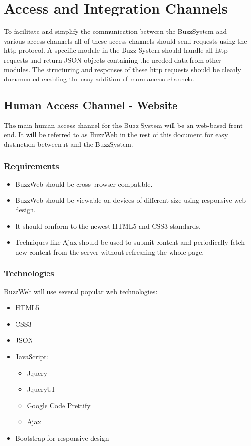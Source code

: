 \section{Access and Integration  Channels}
To facilitate and simplify the communication between the BuzzSystem and various access channels all of these access channels should send requests using the http protocol. A specific module in the Buzz System should handle all http requests and return JSON objects containing the needed data from other modules. The structuring and responses of these http requests should be clearly documented enabling the easy addition of more access channels.

\subsection{Human Access Channel - Website}
The main human access channel for the Buzz System will be an web-based front end. It will be referred to as BuzzWeb in the rest of this document for easy distinction between it and the BuzzSystem.
	\subsubsection{Requirements}
	\begin{itemize}
		\item BuzzWeb should be cross-browser compatible.
		\item BuzzWeb should be viewable on devices of different size using responsive web design.
		\item It should conform to the newest HTML5 and CSS3 standards.
		\item Techniques like Ajax should be used to submit content and periodically fetch new content from the server without refreshing the whole page. 
	\end{itemize}

	\subsubsection{Technologies}
	BuzzWeb will use several popular web technologies:
	\begin{itemize}
		\item HTML5
		\item CSS3
		\item JSON
		\item JavaScript:
			\begin{itemize}
				\item Jquery
				\item JqueryUI
				\item Google Code Prettify
				\item Ajax
			\end{itemize}
		\item Bootstrap for responsive design					
	\end{itemize}
	
